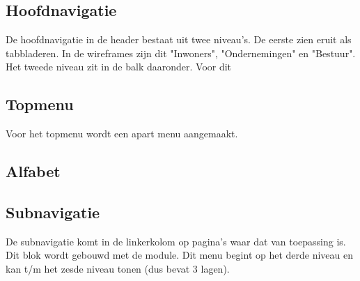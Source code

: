 
\subsection{Hoofdnavigatie}

De hoofdnavigatie in de header bestaat uit twee niveau's. De eerste zien eruit als tabbladeren. In de wireframes zijn dit "Inwoners", "Ondernemingen" en "Bestuur". Het tweede niveau zit in de balk daaronder. Voor dit 

\subsection{Topmenu}

Voor het topmenu wordt een apart menu aangemaakt.

\subsection{Alfabet}

\subsection{Subnavigatie}

De subnavigatie komt in de linkerkolom op pagina's waar dat van toepassing is. Dit blok wordt gebouwd met de  module. Dit menu begint op het derde niveau en kan t/m het zesde niveau tonen (dus bevat 3 lagen).